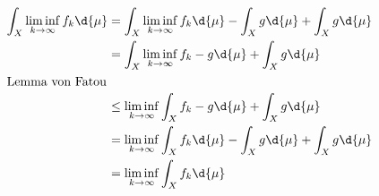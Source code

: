 \documentclass{article}
\begin{document}
\begin{enumerate}[(a)]
        \begin{align*}
            \int_X \liminf\limits_{k \to \infty} f_k \d{\mu} 
            &= \int_X \liminf\limits_{k \to \infty} f_k \d{\mu} - \int_X g \d{\mu} + \int_X g \d{\mu}\\
            &= \int_X \liminf\limits_{k \to \infty} f_k - g \d{\mu} + \int_X g \d{\mu}\\
            \intertext{Lemma von Fatou}
            &\leq \liminf\limits_{k \to \infty} \int_X  f_k - g \d{\mu} + \int_X g \d{\mu}\\
            &= \liminf\limits_{k \to \infty} \int_X  f_k  \d{\mu} - \int_X g \d{\mu} + \int_X g \d{\mu}\\
            &= \liminf\limits_{k \to \infty} \int_X  f_k \d{\mu}
        \end{align*}
    \end{enumerate}
\end{document}
